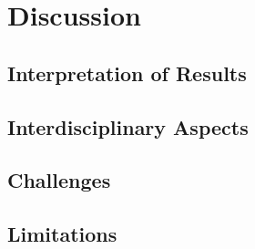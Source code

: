 \chapter{Discussion}
\label{chap:Discussion}

\section{Interpretation of Results}

\section{Interdisciplinary Aspects}

\section{Challenges}

\section{Limitations}
